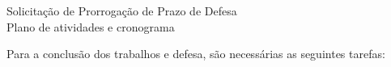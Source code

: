 	\thispagestyle{empty}
	\singlespacing

	\noindent

	\vi
	\vi
	\vi

	\begin{center}
		\Large Solicitação de Prorrogação de Prazo de Defesa\\
		\vi
		\large Plano de atividades e cronograma

	\end{center}
	\vi
	


Para a conclusão dos trabalhos e defesa, são necessárias as seguintes tarefas:


